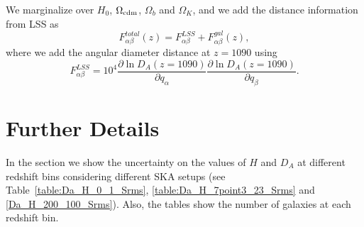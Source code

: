 \documentclass[useAMS,usenatbib]{mn2e}
\begin{document}
We marginalize over $H_0$, $\Omega_{{\rm cdm}}$, $\Omega_b$ and $\Omega_K$, and we add the distance information from LSS  as
\begin{equation}
F^{total}_{\alpha\beta}(z)=F^{LSS}_{\alpha\beta}
+F^{gal}_{\alpha\beta}(z),
\end{equation}
where we add the
angular diameter distance at $z=1090$ using
\begin{equation}\label{add_lss}
 F^{LSS}_{\alpha\beta} = 10^4 \frac{\partial \ln
  D_A(z=1090)}{\partial q_\alpha}\frac{\partial \ln D_A(z=1090)}{\partial q_\beta}.
\end{equation}


\section{Further Details}
In the section we show the uncertainty on the values of $H$ and $D_A$ at different redshift bins considering different SKA setups (see Table~\ref{table:Da_H_0_1_Srms}, \ref{table:Da_H_7point3_23_Srms} and  \ref{Da_H_200_100_Srms}). Also, the tables show the number of galaxies at each redshift bin.
\end{document}
